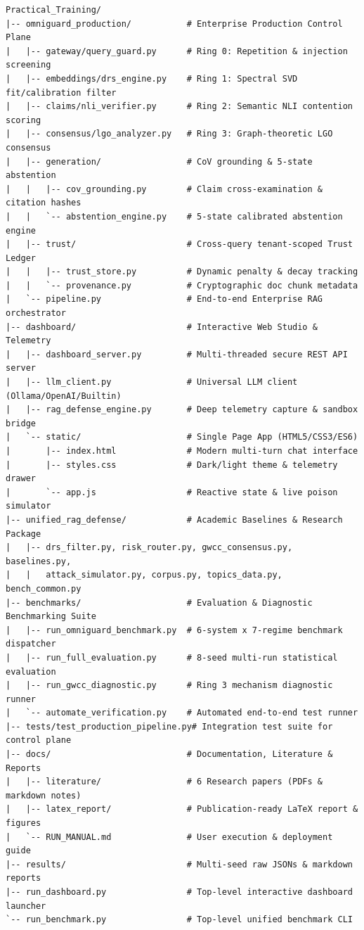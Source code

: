 \begin{scriptsize}
\begin{verbatim}
Practical_Training/
|-- omniguard_production/           # Enterprise Production Control Plane
|   |-- gateway/query_guard.py      # Ring 0: Repetition & injection screening
|   |-- embeddings/drs_engine.py    # Ring 1: Spectral SVD fit/calibration filter
|   |-- claims/nli_verifier.py      # Ring 2: Semantic NLI contention scoring
|   |-- consensus/lgo_analyzer.py   # Ring 3: Graph-theoretic LGO consensus
|   |-- generation/                 # CoV grounding & 5-state abstention
|   |   |-- cov_grounding.py        # Claim cross-examination & citation hashes
|   |   `-- abstention_engine.py    # 5-state calibrated abstention engine
|   |-- trust/                      # Cross-query tenant-scoped Trust Ledger
|   |   |-- trust_store.py          # Dynamic penalty & decay tracking
|   |   `-- provenance.py           # Cryptographic doc chunk metadata
|   `-- pipeline.py                 # End-to-end Enterprise RAG orchestrator
|-- dashboard/                      # Interactive Web Studio & Telemetry
|   |-- dashboard_server.py         # Multi-threaded secure REST API server
|   |-- llm_client.py               # Universal LLM client (Ollama/OpenAI/Builtin)
|   |-- rag_defense_engine.py       # Deep telemetry capture & sandbox bridge
|   `-- static/                     # Single Page App (HTML5/CSS3/ES6)
|       |-- index.html              # Modern multi-turn chat interface
|       |-- styles.css              # Dark/light theme & telemetry drawer
|       `-- app.js                  # Reactive state & live poison simulator
|-- unified_rag_defense/            # Academic Baselines & Research Package
|   |-- drs_filter.py, risk_router.py, gwcc_consensus.py, baselines.py,
|   |   attack_simulator.py, corpus.py, topics_data.py, bench_common.py
|-- benchmarks/                     # Evaluation & Diagnostic Benchmarking Suite
|   |-- run_omniguard_benchmark.py  # 6-system x 7-regime benchmark dispatcher
|   |-- run_full_evaluation.py      # 8-seed multi-run statistical evaluation
|   |-- run_gwcc_diagnostic.py      # Ring 3 mechanism diagnostic runner
|   `-- automate_verification.py    # Automated end-to-end test runner
|-- tests/test_production_pipeline.py# Integration test suite for control plane
|-- docs/                           # Documentation, Literature & Reports
|   |-- literature/                 # 6 Research papers (PDFs & markdown notes)
|   |-- latex_report/               # Publication-ready LaTeX report & figures
|   `-- RUN_MANUAL.md               # User execution & deployment guide
|-- results/                        # Multi-seed raw JSONs & markdown reports
|-- run_dashboard.py                # Top-level interactive dashboard launcher
`-- run_benchmark.py                # Top-level unified benchmark CLI
\end{verbatim}
\end{scriptsize}
